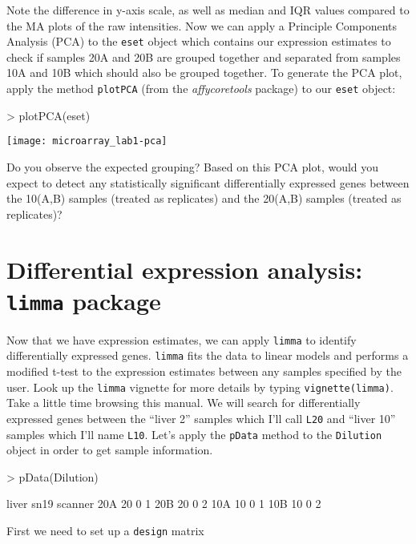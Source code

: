 \documentclass[12pt]{article}
\newcommand{\code}[1]{{\texttt{#1}}}
\begin{document}
Note the difference in y-axis scale, as well as median and IQR values compared to the MA plots of the raw intensities.  Now we can apply a Principle Components Analysis (PCA) to the \code{eset} object which contains our expression estimates to check if samples 20A and 20B are grouped together and separated from samples 10A and 10B which should also be grouped together.
To generate the PCA plot, apply the method \code{plotPCA} (from the {\it affycoretools} package) to our \code{eset} object:

\begin{Schunk}
\begin{Sinput}
> plotPCA(eset)
\end{Sinput}
\end{Schunk}
\texttt{[image: microarray\_lab1-pca]}

Do you observe the expected grouping?  Based on this PCA plot, would you expect to detect any statistically significant differentially expressed genes between the 10(A,B) samples (treated as replicates) and the 20(A,B) samples (treated as replicates)? 

\section{Differential expression analysis: \code{limma} package}

Now that we have expression estimates, we can apply \code{limma} to identify differentially expressed genes.  \code{limma} fits the data to linear models and performs a modified t-test to the expression estimates between any samples specified by the user.  Look up the \code{limma} vignette for more details by typing \code{vignette(limma)}.  Take a little time browsing this manual.  We will search for differentially expressed genes between the ``liver 2'' samples which I'll call \code{L20} and ``liver 10'' samples which I'll name \code{L10}.  Let's apply the \code{pData} method to the \code{Dilution} object in order to get sample information.

\begin{Schunk}
\begin{Sinput}
> pData(Dilution)
\end{Sinput}
\begin{Soutput}
    liver sn19 scanner
20A    20    0       1
20B    20    0       2
10A    10    0       1
10B    10    0       2
\end{Soutput}
\end{Schunk}

First we need to set up a \code{design} matrix
\end{document}
